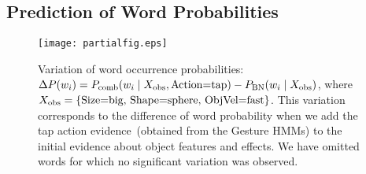 
%

\subsection{Prediction of Word Probabilities}
\label{sec:results:prediction_words}

\begin{figure}
\centering
\texttt{[image: partialfig.eps]}
\caption{Variation of word occurrence probabilities:
$\Delta P(w_i) = P_\text{comb}(w_i \mid X_\text{obs}, \text{Action=tap}) - P_{\text{BN}}(w_i \mid X_\text{obs})$, where $X_\text{obs} = \{ \text{Size=big, Shape=sphere, ObjVel=fast} \}$.
This variation corresponds to the difference of word probability when we add the tap action evidence~(obtained from the Gesture \acp{HMM}) to the initial evidence about object features and effects. We have omitted words for which no significant variation was observed.}
\label{fig:probdiff}
\end{figure}

